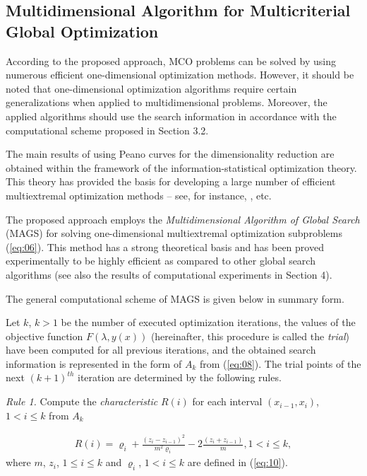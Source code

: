 \documentclass[smallcondensed]{svjour3}     %
\begin{document}
\subsection{Multidimensional Algorithm for Multicriterial Global Optimization}
According to the proposed approach, MCO problems can be solved by using numerous efficient one-dimensional optimization methods. However, it should be noted that one-dimensional optimization algorithms require certain generalizations when applied to multidimensional problems. Moreover, the applied algorithms should use the search information in accordance with the computational scheme proposed in Section 3.2.\par

The main results of using Peano curves for the dimensionality reduction are obtained within the framework of the information-statistical optimization theory. This theory has provided the basis for developing a large number of efficient multiextremal optimization methods -- see, for instance, \cite{c1,c2,c3,c15,c16,c17,c18,c21,c32,c33}, etc. \par

The proposed approach employs the {\it Multidimensional Algorithm of Global Search} (MAGS) \cite{c37,c38} for solving one-dimensional multiextremal optimization subproblems (\ref{eq:06}). This method has a strong theoretical basis and has been proved experimentally to be highly efficient as compared to other global search algorithms (see also the results of computational experiments in Section 4).

The general computational scheme of MAGS is given below in summary form.\par

Let $k$, $k>1$ be the number of executed optimization iterations, the values of the objective function $F(\lambda,y(x))$ (hereinafter, this procedure is called the {\it trial}) have been computed for all previous iterations, and the obtained search information is represented in the form of $A_k$ from (\ref{eq:08}). The trial points of the next $(k+1)^{th}$ iteration are determined by the following rules.

{\it Rule 1.} Compute the {\it characteristic} $R(i)$ for each interval $(x_{i-1}, x_i)$, $1 < i \leq k$ from $A_k$

\begin{eqnarray} \label{eq:12}
R(i) = \varrho_i + \frac{(z_i - z_{i-1})^2}{m^2\varrho_i} - 2 \frac{(z_i + z_{i-1})}{m} , 1 < i \leq k, 
\end{eqnarray}
where $m$, $z_i$, $1 \leq i \leq k$ and $\varrho_i$, $1 < i\leq k$ are defined in (\ref{eq:10}).\par
\end{document}
